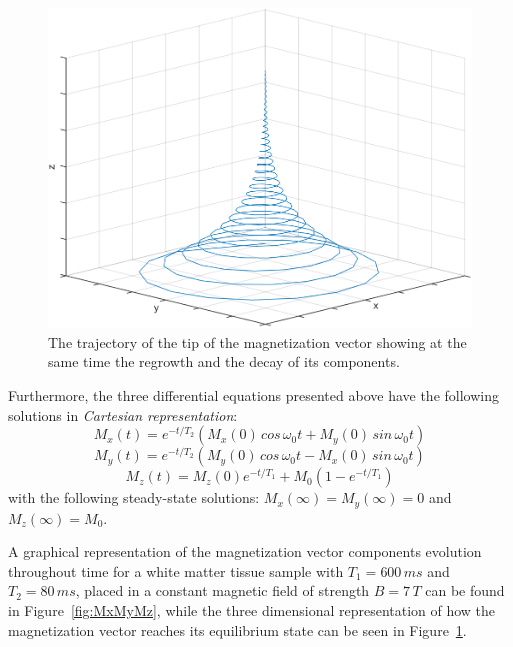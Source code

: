\begin{figure}[ht]
    \centering
    \includegraphics[width=1\textwidth,keepaspectratio]{spiral}
    \caption{The trajectory of the tip of the magnetization vector showing at the same time the regrowth and the decay of its components.}
    \label{fig:spiral}
\end{figure}

Furthermore, the three differential equations presented above have the following solutions in \textit{Cartesian representation}:
\begin{equation} \label{eq:236}
    M_x(t) = e^{-t/T_2} (M_x(0) \, cos \, \omega_0 t + M_y(0) \, sin \, \omega_0 t)
\end{equation}
\begin{equation} \label{eq:237}
    M_y(t) = e^{-t/T_2} (M_y(0) \, cos \, \omega_0 t - M_x(0) \, sin \, \omega_0 t)
\end{equation}
\begin{equation} \label{eq:238}
    M_z(t) = M_z(0) e^{-t/T_1} + M_0 (1 - e^{-t/T_1})
\end{equation}
with the following steady-state solutions: $M_x(\infty) = M_y(\infty) = 0$ and $M_z(\infty) = M_0$.

A graphical representation of the magnetization vector components evolution throughout time for a white matter tissue sample with $T_1 = 600 \, ms$ and $T_2 = 80 \, ms$, placed in a constant magnetic field of strength $B = 7 \, T$ can be found in Figure~\ref{fig:MxMyMz}, while the three dimensional representation of how the magnetization vector reaches its equilibrium state can be seen in Figure~\ref{fig:spiral}.

